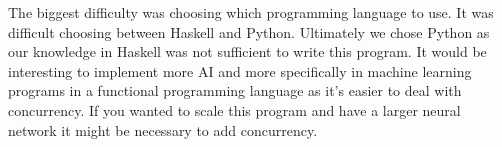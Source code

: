 \documentclass[12pt]{article}
\begin{document}
The biggest difficulty was choosing which programming language to use.
It was difficult choosing between Haskell and Python. Ultimately we chose
Python as our knowledge in Haskell was not sufficient to write this program.
It would be interesting to implement more AI and more specifically in machine
learning programs in a functional programming language as it's easier to deal with
concurrency. If you wanted to scale this program and have a larger neural
network it might be necessary to add concurrency.

\newpage







\end{document}
